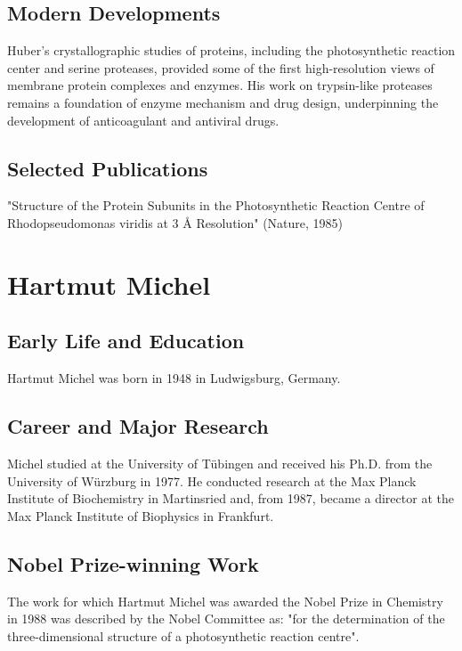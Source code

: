 \subsection*{Modern Developments}

Huber's crystallographic studies of proteins, including the photosynthetic reaction center and serine proteases, provided some of the first high-resolution views of membrane protein complexes and enzymes. His work on trypsin-like proteases remains a foundation of enzyme mechanism and drug design, underpinning the development of anticoagulant and antiviral drugs.

\subsection*{Selected Publications}

"Structure of the Protein Subunits in the Photosynthetic Reaction Centre of Rhodopseudomonas viridis at 3 Å Resolution" (Nature, 1985)

\clearpage

\section{Hartmut Michel}

\subsection*{Early Life and Education}

Hartmut Michel was born in 1948 in Ludwigsburg, Germany.

\subsection*{Career and Major Research}

Michel studied at the University of Tübingen and received his Ph.D. from the University of Würzburg in 1977. He conducted research at the Max Planck Institute of Biochemistry in Martinsried and, from 1987, became a director at the Max Planck Institute of Biophysics in Frankfurt.

\subsection*{Nobel Prize-winning Work}

The work for which Hartmut Michel was awarded the Nobel Prize in Chemistry in 1988 was described by the Nobel Committee as: "for the determination of the three-dimensional structure of a photosynthetic reaction centre".

